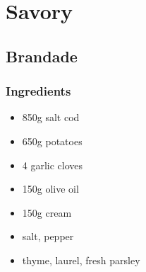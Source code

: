 \documentclass[10pt]{book}
\begin{document}

\newpage
\chapter*{Savory}


\newpage
\section*{Brandade}
\subsection*{Ingredients}
	\begin{itemize}
		\item 850g salt cod
		\item 650g potatoes
		\item 4 garlic cloves
		\item 150g olive oil
		\item 150g cream
		\item salt, pepper
		\item thyme, laurel, fresh parsley
	\end{itemize}
\end{document}
